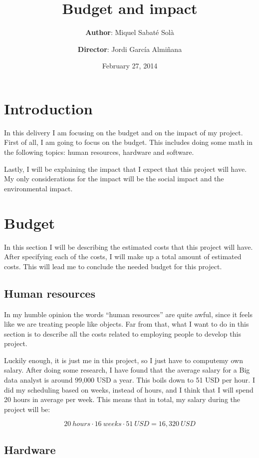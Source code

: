 \documentclass[a4paper,12pt]{article}
\title{\bf Budget and impact}
\author{
  {\bf Author}: Miquel Sabaté Solà
  \and
  {\bf Director}: Jordi García Almiñana
}
\date{February 27, 2014}
\begin{document}
\clearpage\maketitle

\setcounter{page}{1}
\section{Introduction}

In this delivery I am focusing on the budget and on the impact of my project.
First of all, I am going to focus on the budget. This includes doing some math
in the following topics: human resources, hardware and software.

Lastly, I will be explaining the impact that I expect that this project will
have. My only considerations for the impact will be the social impact and the
environmental impact.

\section{Budget}

In this section I will be describing the estimated costs that this project will
have. After specifying each of the costs, I will make up a total amount of
estimated costs. This will lead me to conclude the needed budget for this
project.

\subsection{Human resources}

In my humble opinion the words ``human resources'' are quite awful, since it
feels like we are treating people like objects. Far from that, what I want to
do in this section is to describe all the costs related to employing people to
develop this project.

Luckily enough, it is just me in this project, so I just have to computemy own
salary. After doing some research, I have found that the average salary for a
Big data analyst is around 99,000 USD a year. This boils down to 51 USD per
hour. I did my scheduling based on weeks, instead of hours, and I think that I
will spend 20 hours in average per week. This means that in total, my salary
during the project will be:

\[
  20\ hours \cdot 16\ weeks \cdot 51\ USD = 16,320\ USD
\]


\subsection{Hardware}
\end{document}
